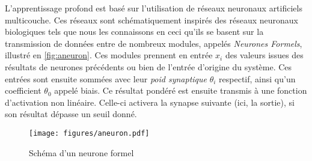 			L'apprentissage profond est basé sur l'utilisation de réseaux neuronaux artificiels multicouche. Ces réseaux sont schématiquement inspirés des réseaux neuronaux biologiques tels que nous les connaissons en ceci qu'ils se basent sur la transmission de données entre de nombreux modules, appelés \emph{Neurones Formels}, illustré en \autoref{fig:aneuron}. Ces modules prennent en entrée $x_{i}$ des valeurs issues des résultats de neurones précédents ou bien de l'entrée d'origine du système. Ces entrées sont ensuite sommées avec leur \emph{poid synaptique} $\theta_{i}$ respectif, ainsi qu’un coefficient $\theta_{0}$ appelé biais. Ce résultat pondéré est ensuite transmis à une fonction d’activation non linéaire. Celle-ci activera la synapse suivante (ici, la sortie), si son résultat dépasse un seuil donné.
			\begin{figure}[h]
			{
				\centering
				\texttt{[image: figures/aneuron.pdf]}
				\caption{Schéma d'un neurone formel}
				\label{fig:aneuron}
			}
			\end{figure}
			
			

